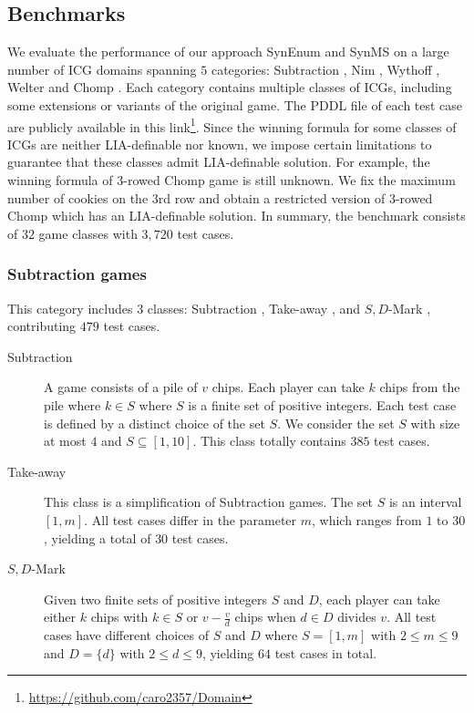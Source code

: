 \documentclass[review]{elsarticle}
\newcommand{\set}[1]{\{ #1 \}}
\begin{document}
\subsection{Benchmarks}
We evaluate the performance of our approach SynEnum and SynMS on a large number of ICG domains spanning $5$ categories: Subtraction \cite{Yag2001}, Nim \cite{Bou1901}, Wythoff \cite{Wyt1907}, Welter \cite{Wel1952} and Chomp \cite{Sch1952}.
Each category contains multiple classes of ICGs, including some extensions or variants of the original game.
The PDDL file of each test case are publicly available in this link\footnote{\url{https://github.com/caro2357/Domain}}.
Since the winning formula for some classes of ICGs are neither LIA-definable nor known, we impose certain limitations to guarantee that these classes admit LIA-definable solution.
For example, the winning formula of 3-rowed Chomp game is still unknown.
We fix the maximum number of cookies on the 3rd row and obtain a restricted version of 3-rowed Chomp which has an LIA-definable solution.
In summary, the benchmark consists of $32$ game classes with $3,720$ test cases.

\subsubsection{Subtraction games}
This category includes $3$ classes: Subtraction \cite{Yag2001}, Take-away \cite{Gol1966}, and $S,D$-Mark \cite{Sop2016}, contributing $479$ test cases. %

\begin{description}
	\item[Subtraction] 
	A game consists of a pile of $v$ chips.
	Each player can take $k$ chips from the pile where $k \in S$ where $S$ is a finite set of positive integers.
	Each test case is defined by a distinct choice of the set $S$.
	We consider the set $S$ with size at most $4$ and $S \subseteq [1, 10]$.
	This class totally contains $385$ test cases.
	
	\item[Take-away] This class is a simplification of Subtraction games.
	The set $S$ is an interval $[1, m]$.
	All test cases differ in the parameter $m$, which ranges from $1$ to $30$, yielding a total of $30$ test cases.	

	
	\item[$S,D$-Mark] Given two finite sets of positive integers $S$ and $D$, each player can take either $k$ chips with $k \in S$ or $v - \frac{v}{d}$ chips when $d \in D$ divides $v$.
	All test cases have different choices of $S$ and $D$ where $S = [1, m]$ with $2 \leq m \leq 9$ and $D = \set{d}$ with $2 \leq d \leq 9$, yielding $64$ test cases in total.
\end{description}
\end{document}
